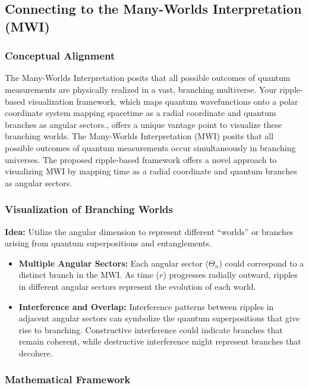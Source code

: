 \documentclass[12pt]{article}
\begin{document}
\subsection{Connecting to the Many-Worlds Interpretation (MWI)}
\subsubsection{Conceptual Alignment}
The Many-Worlds Interpretation posits that all possible outcomes of quantum measurements are physically realized in a vast, branching multiverse. Your ripple-based visualization framework, which maps quantum wavefunctions onto a polar coordinate system mapping spacetime as a radial coordinate and quantum branches as angular sectors., offers a unique vantage point to visualize these branching worlds.
The Many-Worlds Interpretation (MWI) posits that all possible outcomes of quantum measurements occur simultaneously in branching universes. The proposed ripple-based framework offers a novel approach to visualizing MWI by mapping time as a radial coordinate and quantum branches as angular sectors.

\subsubsection{Visualization of Branching Worlds}
\textbf{Idea:} Utilize the angular dimension to represent different “worlds” or branches arising from quantum superpositions and entanglements.

\begin{itemize}
    \item \textbf{Multiple Angular Sectors:} Each angular sector (\(\Theta_n\)) could correspond to a distinct branch in the MWI. As time (\(r\)) progresses radially outward, ripples in different angular sectors represent the evolution of each world.
    
    \item \textbf{Interference and Overlap:} Interference patterns between ripples in adjacent angular sectors can symbolize the quantum superpositions that give rise to branching. Constructive interference could indicate branches that remain coherent, while destructive interference might represent branches that decohere.
\end{itemize}

\subsubsection{Mathematical Framework}
\end{document}
